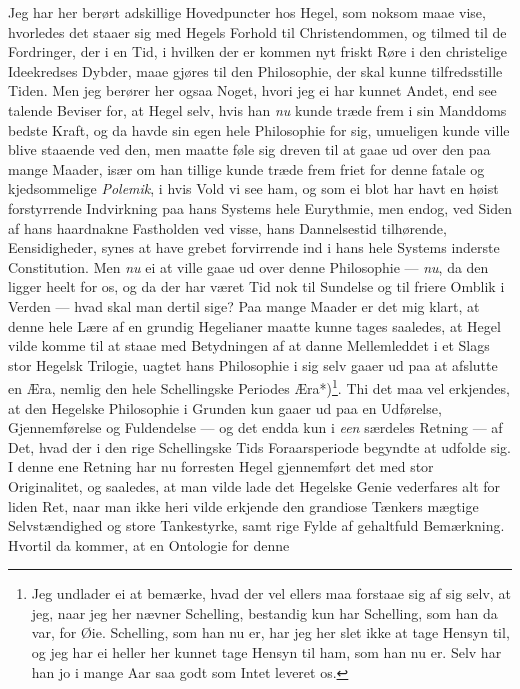 \documentclass[12pt,a4paper]{book}
\newcommand{\apage}[1]{\marginnote{\footnotesize\textit{[#1]}}}
\begin{document}
Jeg har her berørt adskillige Hovedpuncter hos Hegel, som noksom maae vise,
hvorledes det staaer sig med Hegels Forhold \apage{16} til Christendommen, og tilmed
til de Fordringer, der i en Tid, i hvilken der er kommen nyt friskt Røre i
den christelige Ideekredses Dybder, maae gjøres til den Philosophie, der
skal kunne tilfredsstille Tiden. Men jeg berører her ogsaa Noget, hvori jeg
ei har kunnet Andet, end see talende Beviser for, at Hegel selv, hvis han
\emph{nu} kunde træde frem i sin Manddoms bedste Kraft, og da havde sin egen hele
Philosophie for sig, umueligen kunde ville blive staaende ved den, men
maatte føle sig dreven til at gaae ud over den paa mange Maader, især om han
tillige kunde træde frem friet for denne fatale og kjedsommelige \emph{Polemik}, i
hvis Vold vi see ham, og som ei blot har havt en høist forstyrrende
Indvirkning paa hans Systems hele Eurythmie, men endog, ved Siden af hans
haardnakne Fastholden ved visse, hans Dannelsestid tilhørende,
Eensidigheder, synes at have grebet forvirrende ind i hans hele Systems
inderste Constitution. Men \emph{nu} ei at ville gaae ud over denne Philosophie
--- \emph{nu}, da den ligger heelt for os, og da der har været Tid nok til
Sundelse og til friere Omblik i Verden --- hvad skal man dertil sige? Paa
mange Maader er det mig klart, at denne hele Lære af en grundig Hegelianer
maatte kunne tages saaledes, at Hegel vilde komme til at staae med
Betydningen af at danne Mellemleddet i et Slags stor Hegelsk Trilogie,
uagtet hans Philosophie i sig selv gaaer ud paa at afslutte en Æra, nemlig
den hele Schellingske Periodes Æra*)\footnote{Jeg undlader ei at bemærke,
hvad der vel ellers maa forstaae sig af sig selv, at jeg, naar jeg her
nævner Schelling, bestandig kun har Schelling, som han da var, for Øie.
Schelling, som han nu er, har jeg her slet ikke at tage Hensyn til, og jeg
har ei heller her kunnet tage Hensyn til ham, som han nu er. Selv har han jo
i mange Aar saa godt som Intet leveret os.}. Thi det maa vel erkjendes, at
den Hegelske Philosophie i Grunden kun gaaer ud paa en Udførelse,
Gjennemførelse og Fuldendelse --- og det endda kun i \emph{een} særdeles Retning
--- af Det, hvad der i den \apage{17} rige Schellingske Tids Foraarsperiode begyndte at
udfolde sig. I denne ene Retning har nu forresten Hegel gjennemført det med
stor Originalitet, og saaledes, at man vilde lade det Hegelske Genie
vederfares alt for liden Ret, naar man ikke heri vilde erkjende den
grandiose Tænkers mægtige Selvstændighed og store Tankestyrke, samt rige
Fylde af gehaltfuld Bemærkning. Hvortil da kommer, at en Ontologie for denne
\end{document}
